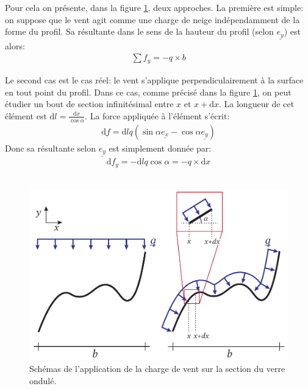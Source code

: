 \documentclass[11pt,titlepage]{article}
\begin{document}
Pour cela on présente, dans la figure \ref{fig:ondul_cas}, deux approches. La première est simple: on suppose que le vent agit comme une charge de neige indépendamment de la forme du profil. Sa résultante dans le sens de la hauteur du profil (selon $\underline{e_y}$) est alors:
\begin{align}
    \sum f_y = -q\times b 
\end{align}

Le second cas est le cas réel: le vent s'applique perpendiculairement à la surface en tout point du profil. Dans ce cas, comme précisé dans la figure \ref{fig:ondul_cas}, on peut étudier un bout de section infinitésimal entre $x$ et $x+\mathrm{d}x$. La longueur de cet élément est $\mathrm{d}l = \frac{\mathrm{d}x}{\cos \alpha}$. La force appliquée à l'élément s'écrit:
\begin{align}
    \underline{\mathrm{d}f} = \mathrm{d}l q \left (\sin \alpha \underline{e_x} - \cos \alpha \underline{e_y}\right )
\end{align}
Donc sa résultante selon $\underline{e_y}$ est simplement donnée par:
\begin{align}
    \mathrm{d}f_y = - \mathrm{d}l q\cos \alpha = -q \times \mathrm{d}x
\end{align}
\\[0.5cm]

\begin{figure}
    \vspace{-30pt}
    \centering
\includegraphics[width=0.9\linewidth]{img/ondul/proj_load.pdf}
\caption{Schémas de l'application de la charge de vent sur la section du verre ondulé.}
\label{fig:ondul_cas}
\vspace{10pt}
\end{figure}
\end{document}
